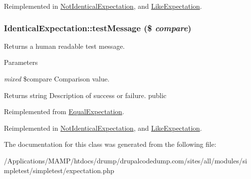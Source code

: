 Reimplemented in \hyperlink{class_not_identical_expectation_a2e3d68e7804396cb418a9ef2d00c128e}{NotIdenticalExpectation}, and \hyperlink{class_like_expectation_a58e0a803b7016efd6516fea5d9753f82}{LikeExpectation}.\hypertarget{class_identical_expectation_a80c36b4efb3126695a69d4823ab3122b}{
\subsubsection[{testMessage}]{\setlength{\rightskip}{0pt plus 5cm}IdenticalExpectation::testMessage (\$ {\em compare})}}
\label{class_identical_expectation_a80c36b4efb3126695a69d4823ab3122b}
Returns a human readable test message. 
\begin{DoxyParams}{Parameters}
\item[{\em mixed}]\$compare Comparison value. \end{DoxyParams}
\begin{DoxyReturn}{Returns}
string Description of success or failure.  public 
\end{DoxyReturn}


Reimplemented from \hyperlink{class_equal_expectation_a707aa690ff9312ff1b99733d859f7f6f}{EqualExpectation}.

Reimplemented in \hyperlink{class_not_identical_expectation_a4d2927f2f29f63f7cff7e0e24a555d85}{NotIdenticalExpectation}, and \hyperlink{class_like_expectation_a421ebb1546193d32db6461d930150052}{LikeExpectation}.

The documentation for this class was generated from the following file:\begin{DoxyCompactItemize}
\item 
/Applications/MAMP/htdocs/drump/drupalcodedump.com/sites/all/modules/simpletest/simpletest/expectation.php\end{DoxyCompactItemize}
